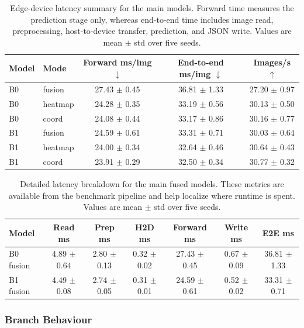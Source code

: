 \documentclass[10pt,letterpaper]{article}
\begin{document}
\begin{table}[t]
\centering
\footnotesize
\caption{Edge-device latency summary for the main models. Forward time measures the prediction stage only, whereas end-to-end time includes image read, preprocessing, host-to-device transfer, prediction, and JSON write. Values are mean $\pm$ std over five seeds.}
\label{tab:latency}
\begin{tabular}{llccc}
\toprule
Model & Mode & Forward ms/img $\downarrow$ & End-to-end ms/img $\downarrow$ & Images/s $\uparrow$ \\
\midrule
B0 & fusion & 27.43 $\pm$ 0.45 & 36.81 $\pm$ 1.33 & 27.20 $\pm$ 0.97 \\
B0 & heatmap & 24.28 $\pm$ 0.35 & 33.19 $\pm$ 0.56 & 30.13 $\pm$ 0.50 \\
B0 & coord & 24.08 $\pm$ 0.44 & 33.17 $\pm$ 0.86 & 30.16 $\pm$ 0.77 \\
B1 & fusion & 24.59 $\pm$ 0.61 & 33.31 $\pm$ 0.71 & 30.03 $\pm$ 0.64 \\
B1 & heatmap & 24.00 $\pm$ 0.34 & 32.64 $\pm$ 0.46 & 30.64 $\pm$ 0.43 \\
B1 & coord & 23.91 $\pm$ 0.29 & 32.50 $\pm$ 0.34 & 30.77 $\pm$ 0.32 \\
\bottomrule
\end{tabular}
\end{table}

\begin{table}[t]
\centering
\footnotesize
\caption{Detailed latency breakdown for the main fused models. These metrics are available from the benchmark pipeline and help localize where runtime is spent. Values are mean $\pm$ std over five seeds.}
\label{tab:latency_breakdown}
\begin{tabular}{lcccccc}
\toprule
Model & Read ms & Prep ms & H2D ms & Forward ms & Write ms & E2E ms \\
\midrule
B0 fusion & 4.89 $\pm$ 0.64 & 2.80 $\pm$ 0.13 & 0.32 $\pm$ 0.02 & 27.43 $\pm$ 0.45 & 0.67 $\pm$ 0.09 & 36.81 $\pm$ 1.33 \\
B1 fusion & 4.49 $\pm$ 0.08 & 2.74 $\pm$ 0.05 & 0.31 $\pm$ 0.01 & 24.59 $\pm$ 0.61 & 0.52 $\pm$ 0.02 & 33.31 $\pm$ 0.71 \\
\bottomrule
\end{tabular}
\end{table}

\subsubsection{Branch Behaviour}
\end{document}
